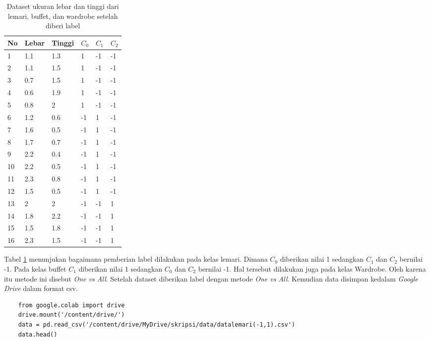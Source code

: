\begin{table}[H]
    \centering
    \begin{tabular}{||p{1em}|p{3em}|p{3em}|p{2em}|p{2em}|p{2em}||}
    \hline
       No & Lebar & Tinggi & $C_0$ & $C_1$ & $C_2$\\ [0.5ex]
        \hline\hline
        1 & 1.1 & 1.3 & 1 & -1 & -1\\ \hline 
        2 & 1.1 & 1.5 & 1 & -1 & -1\\ \hline	
        3 & 0.7 & 1.5 & 1 & -1 & -1\\ \hline	
        4 & 0.6 & 1.9 & 1 & -1 & -1\\ \hline	
        5 & 0.8 & 2 & 1 & -1 & -1\\ \hline	
        6 & 1.2 & 0.6 & -1 & 1 & -1\\ \hline	
        7 & 1.6 & 0.5 & -1 & 1 & -1\\ \hline	
        8 & 1.7 & 0.7 & -1 & 1 & -1\\ \hline	
        9 & 2.2 & 0.4 & -1 & 1 & -1\\ \hline	
        10 & 2.2 & 0.5 & -1 & 1 & -1\\ \hline	
        11 & 2.3 & 0.8 & -1 & 1 & -1\\ \hline	
        12 & 1.5 & 0.5 & -1 & 1 & -1\\ \hline
        13 & 2 & 2 & -1 & -1 & 1\\ \hline
        14 & 1.8 & 2.2 & -1 & -1 & 1\\ \hline	
        15 & 1.5 & 1.8 & -1 & -1 & 1\\ \hline	
        16 & 2.3 & 1.5 & -1 & -1 & 1\\ \hline
        \end{tabular}
    \caption{Dataset ukuran lebar dan tinggi dari lemari, buffet, dan wardrobe setelah diberi label}
    \label{tab:Dataset label}
\end{table}

Tabel \ref{tab:Dataset label} menunjukan bagaimana pemberian label dilakukan pada kelas lemari. Dimana $C_0$ diberikan nilai 1 sedangkan $C_1$ dan $C_2$ bernilai -1. Pada kelas buffet $C_1$ diberikan nilai 1 sedangkan $C_0$ dan $C_2$ bernilai -1. Hal tersebut dilakukan juga pada kelas Wardrobe. Oleh karena itu metode ini disebut \textit{One vs All}. Setelah dataset  diberikan label dengan metode \textit{One vs All}. Kemudian data disimpan kedalam \textit{Google Drive} dalam format csv.

\begin{lstlisting}
    from google.colab import drive
    drive.mount('/content/drive/')
    data = pd.read_csv('/content/drive/MyDrive/skripsi/data/datalemari(-1,1).csv')
    data.head()
\end{lstlisting}


